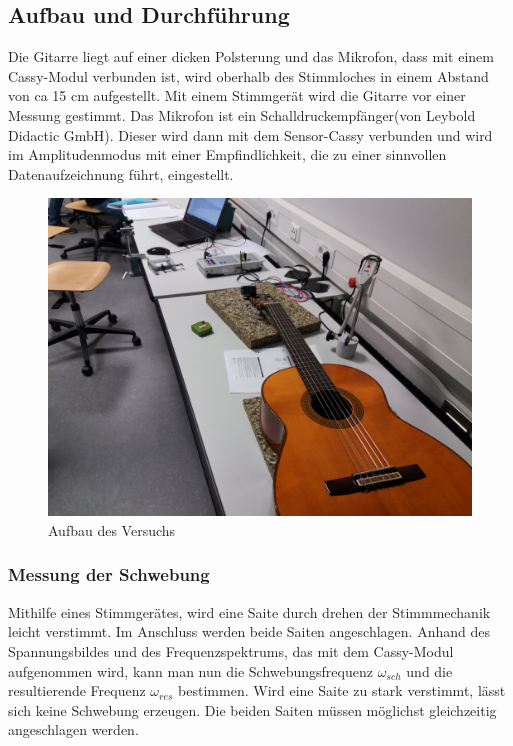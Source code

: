 \documentclass[a4paper, 11pt]{article}
\begin{document}
\subsection{Aufbau und Durchführung}
Die Gitarre liegt auf einer dicken Polsterung und das Mikrofon, dass mit einem Cassy-Modul verbunden ist, wird oberhalb des Stimmloches in einem Abstand von ca 15 cm aufgestellt. 
Mit einem Stimmgerät wird die Gitarre vor einer Messung gestimmt. Das Mikrofon ist ein Schalldruckempfänger(von Leybold Didactic GmbH). Dieser wird dann mit dem Sensor-Cassy verbunden und wird im Amplitudenmodus mit einer Empfindlichkeit, die zu einer sinnvollen Datenaufzeichnung führt, eingestellt.
\begin{figure}[H]
	\centering
	\includegraphics[scale=0.05]{../Gitarre.jpg}
	\caption{Aufbau des Versuchs}
	\label{fig:Aufbau des Versuchs}
\end{figure}

\subsubsection{Messung der Schwebung}
Mithilfe eines Stimmgerätes, wird eine Saite durch drehen der Stimmmechanik leicht verstimmt. Im Anschluss werden beide Saiten angeschlagen. Anhand des Spannungsbildes und des Frequenzspektrums, das mit dem Cassy-Modul aufgenommen wird, kann man nun die Schwebungsfrequenz $\omega_{sch}$ und die resultierende Frequenz $\omega_{res}$ bestimmen. Wird eine Saite zu stark verstimmt, lässt sich keine Schwebung erzeugen. Die beiden Saiten müssen möglichst gleichzeitig angeschlagen werden.
\end{document}
